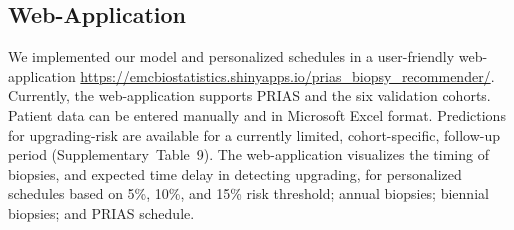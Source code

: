 \subsection{Web-Application}
We implemented our model and personalized schedules in a user-friendly web-application \url{https://emcbiostatistics.shinyapps.io/prias_biopsy_recommender/}. Currently, the web-application supports PRIAS and the six validation cohorts. Patient data can be entered manually and in Microsoft Excel format. Predictions for upgrading-risk are available for a currently limited, cohort-specific, follow-up period (Supplementary~Table~9). The web-application visualizes the timing of biopsies, and expected time delay in detecting upgrading, for personalized schedules based on 5\%, 10\%, and 15\% risk threshold; annual biopsies; biennial biopsies; and PRIAS schedule.